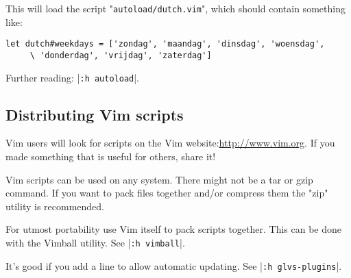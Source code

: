 This will load the script "\verb!autoload/dutch.vim!", which should contain something like:

\begin{Verbatim}[samepage=true]
 let dutch#weekdays = ['zondag', 'maandag', 'dinsdag', 'woensdag',
     \ 'donderdag', 'vrijdag', 'zaterdag']
\end{Verbatim}

Further reading: |\verb!:h autoload!|.
\subsection{Distributing Vim scripts}
\label{distribute-script}
Vim users will look for scripts on the Vim website:\url{http://www.vim.org}.
If you made something that is useful for others, share it!

Vim scripts can be used on any system.
There might not be a tar or gzip command.
If you want to pack files together and/or compress them the "zip" utility is recommended.

For utmost portability use Vim itself to pack scripts together.
This can be done with the Vimball utility.
See |\verb!:h vimball!|.

It's good if you add a line to allow automatic updating.
See |\verb!:h glvs-plugins!|.
\clearpage
